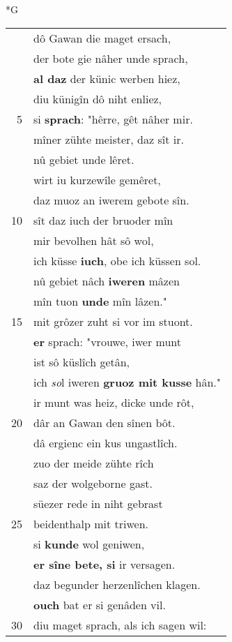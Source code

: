 \documentclass[8pt,a4paper,notitlepage]{article}
\begin{document}
\begin{table}[ht]
\begin{minipage}[t]{0.5\linewidth}
\small
\begin{center}*G
\end{center}
\begin{tabular}{rl}
 & dô Gawan die maget ersach,\\ 
 & der bote gie nâher unde sprach,\\ 
 & \textbf{al daz} der künic werben hiez,\\ 
 & diu künigîn dô niht enliez,\\ 
5 & si \textbf{sprach}: "hêrre, gêt nâher mir.\\ 
 & mîner zühte meister, daz sît ir.\\ 
 & nû gebiet unde lêret.\\ 
 & wirt iu kurzewîle gemêret,\\ 
 & daz muoz an iwerem gebote sîn.\\ 
10 & sît daz iuch der bruoder mîn\\ 
 & mir bevolhen hât sô wol,\\ 
 & ich küsse \textbf{iuch}, obe ich küssen sol.\\ 
 & nû gebiet nâch \textbf{iweren} mâzen\\ 
 & mîn tuon \textbf{unde} mîn lâzen."\\ 
15 & mit grôzer zuht si vor im stuont.\\ 
 & \textbf{er} sprach: "vrouwe, iwer munt\\ 
 & ist sô küslîch getân,\\ 
 & ich \textit{so}l iweren \textbf{gruoz mit kusse} hân."\\ 
 & ir munt was heiz, dicke unde rôt,\\ 
20 & dâr an Gawan den sînen bôt.\\ 
 & dâ ergienc ein kus ungastlîch.\\ 
 & zuo der meide zühte rîch\\ 
 & saz der wolgeborne gast.\\ 
 & süezer rede in niht gebrast\\ 
25 & beidenthalp mit triwen.\\ 
 & si \textbf{kunde} wol geniwen,\\ 
 & \textbf{er sîne bete, si} ir versagen.\\ 
 & daz begunder herzenlîchen klagen.\\ 
 & \textbf{ouch} bat er si genâden vil.\\ 
30 & diu maget sprach, als ich sagen wil:\\ 

\end{tabular}
\end{minipage}
\end{table}
\end{document}
